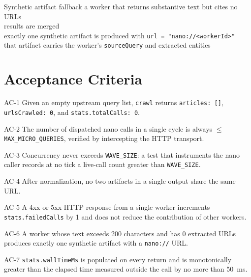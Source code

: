 \begin{scenario}{Synthetic artifact fallback}
\Given a worker that returns substantive text but cites no URLs \\
\When results are merged \\
\Then exactly one synthetic artifact is produced with \texttt{url = "nano://<workerId>"} \\
\And that artifact carries the worker's \texttt{sourceQuery} and extracted entities
\end{scenario}

\section{Acceptance Criteria}

\begin{ac}{AC-1}
Given an empty upstream query list, \texttt{crawl} returns \texttt{articles: []}, \texttt{urlsCrawled: 0}, and \texttt{stats.totalCalls: 0}.
\end{ac}

\begin{ac}{AC-2}
The number of dispatched nano calls in a single cycle is always \(\le\) \texttt{MAX\_MICRO\_QUERIES}, verified by intercepting the HTTP transport.
\end{ac}

\begin{ac}{AC-3}
Concurrency never exceeds \texttt{WAVE\_SIZE}: a test that instruments the nano caller records at no tick a live-call count greater than \texttt{WAVE\_SIZE}.
\end{ac}

\begin{ac}{AC-4}
After normalization, no two artifacts in a single output share the same URL.
\end{ac}

\begin{ac}{AC-5}
A 4xx or 5xx HTTP response from a single worker increments \texttt{stats.failedCalls} by 1 and does not reduce the contribution of other workers.
\end{ac}

\begin{ac}{AC-6}
A worker whose text exceeds 200 characters and has 0 extracted URLs produces exactly one synthetic artifact with a \texttt{nano://} URL.
\end{ac}

\begin{ac}{AC-7}
\texttt{stats.wallTimeMs} is populated on every return and is monotonically greater than the elapsed time measured outside the call by no more than 50~ms.
\end{ac}

